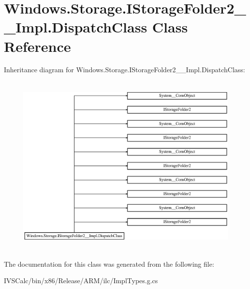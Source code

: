 \hypertarget{class_windows_1_1_storage_1_1_i_storage_folder2_____impl_1_1_dispatch_class}{}\section{Windows.\+Storage.\+I\+Storage\+Folder2\+\_\+\+\_\+\+Impl.\+Dispatch\+Class Class Reference}
\label{class_windows_1_1_storage_1_1_i_storage_folder2_____impl_1_1_dispatch_class}
Inheritance diagram for Windows.\+Storage.\+I\+Storage\+Folder2\+\_\+\+\_\+\+Impl.\+Dispatch\+Class\+:\begin{figure}[H]
\begin{center}
\leavevmode
\includegraphics[height=9.249249cm]{class_windows_1_1_storage_1_1_i_storage_folder2_____impl_1_1_dispatch_class}
\end{center}
\end{figure}


The documentation for this class was generated from the following file\+:\begin{DoxyCompactItemize}
\item 
I\+V\+S\+Calc/bin/x86/\+Release/\+A\+R\+M/ilc/Impl\+Types.\+g.\+cs\end{DoxyCompactItemize}

